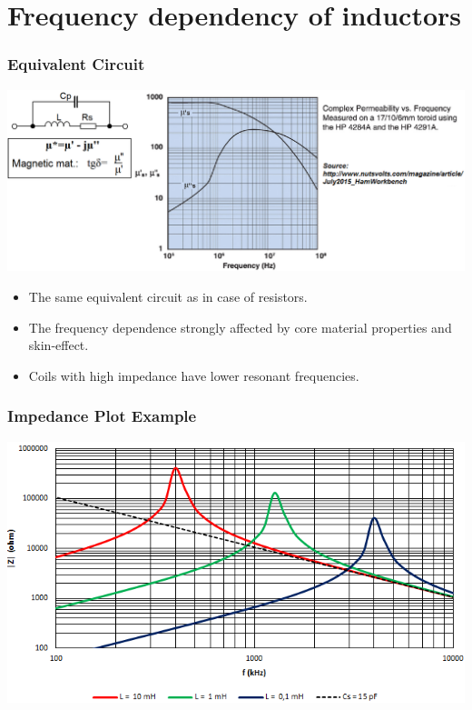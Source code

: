 \documentclass{beamer}
\begin{document}
\section{\texorpdfstring{Frequency dependency of inductors}{Frequency dependency of inductors}}
	\begin{frame}
    \frametitle{Equivalent Circuit}
		\begin{center}
		\includegraphics[scale=0.25]{obr10_ekvSchL2.png}
		\end{center}
    
		\begin{itemize}
			\item The same equivalent circuit as in case of resistors.
			\item The frequency dependence strongly affected by core material properties and skin-effect.
			\item Coils with high impedance have lower resonant frequencies.
		\end{itemize}
	\end{frame}
	\begin{frame}
    \frametitle{Impedance Plot Example}

		\begin{center}
			\includegraphics[scale=0.62]{obr04_impedanceL.png}
		\end{center}
	\end{frame}
\end{document}
